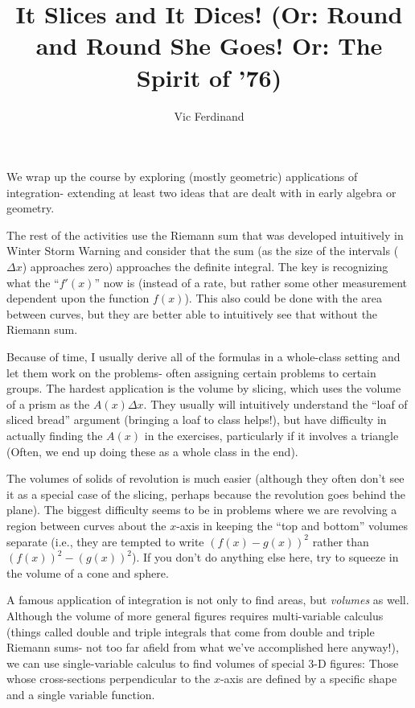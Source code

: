 \documentclass{ximera}
\author{Vic Ferdinand}
\title{It Slices and It Dices! (Or: Round and Round She Goes! Or: The Spirit of '76)}
\begin{document}
\begin{abstract}
\end{abstract}
\maketitle

\begin{instructorIntro}
We wrap up the course by exploring (mostly geometric) applications of integration- extending at least two ideas that are dealt with in early algebra or geometry.  

The rest of the activities use the Riemann sum that was developed intuitively in Winter Storm Warning and consider that the sum (as the size of the intervals ($\Delta x$) approaches zero) approaches the definite integral.  The key is recognizing what the ``$f'(x)$'' now is (instead of a rate, but rather some other measurement dependent upon the function $f(x)$).  This also could be done with the area between curves, but they are better able to intuitively see that without the Riemann sum. 

Because of time, I usually derive all of the formulas in a whole-class setting and let them work on the problems- often assigning certain problems to certain groups. The hardest application is the volume by slicing, which uses the volume of a prism as the $A(x) \Delta x$.  They usually will intuitively understand the ``loaf of sliced bread'' argument (bringing a loaf to class helps!), but have difficulty in actually finding the $A(x)$ in the exercises, particularly if it involves a triangle (Often, we end up doing these as a whole class in the end).

The volumes of solids of revolution is much easier (although they often don't see it as a special case of the slicing, perhaps because the revolution goes behind the plane).  The biggest difficulty seems to be in problems where we are revolving a region between curves about the $x$-axis in keeping the ``top and bottom'' volumes separate (i.e., they are tempted to write $(f(x)-g(x))^2$ rather than $(f(x))^2 - (g(x))^2$).  If you don't do anything else here, try to squeeze in the volume of a cone and sphere.

\end{instructorIntro}

A famous application of integration is not only to find areas, but {\em volumes} as well.  Although the volume of more general figures requires multi-variable calculus (things called double and triple integrals that come from double and triple Riemann sums- not too far afield from what we've accomplished here anyway!), we can use single-variable calculus to find volumes of special $3$-D figures:  Those whose cross-sections perpendicular to the $x$-axis are defined by a specific shape and a single variable function.
\end{document}
